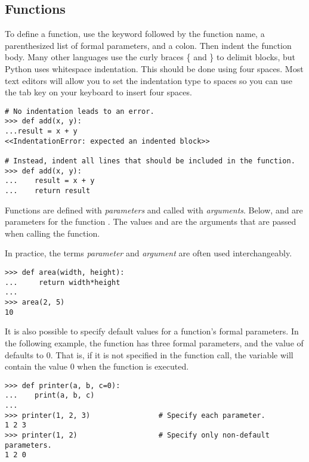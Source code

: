 \subsection*{Functions}

To define a function, use the  keyword followed by the function name, a parenthesized list of formal parameters, and a colon.
Then indent the function body.
Many other languages use the curly braces \{ and \} to delimit blocks, but Python uses whitespace indentation.
This should be done using four spaces.
Most text editors will allow you to set the indentation type to spaces so you can use the tab key on your keyboard to insert four spaces.

\begin{lstlisting}
# No indentation leads to an error.
>>> def add(x, y):
...result = x + y
<<IndentationError: expected an indented block>>

# Instead, indent all lines that should be included in the function.
>>> def add(x, y):
...    result = x + y
...    return result
\end{lstlisting}

Functions are defined with \emph{parameters} and called with \emph{arguments}.
Below,  and  are parameters for the function .
The values  and  are the arguments that are passed when calling the function.

In practice, the terms \emph{parameter} and \emph{argument} are often used interchangeably.

\begin{lstlisting}
>>> def area(width, height):
...     return width*height
...         
>>> area(2, 5)
10
\end{lstlisting}

It is also possible to specify default values for a function's formal parameters.
In the following example, the function  has three formal parameters, and the value of  defaults to 0.
That is, if it is not specified in the function call, the variable  will contain the value 0 when the function is executed.

\begin{lstlisting}
>>> def printer(a, b, c=0):
...    print(a, b, c)
...
>>> printer(1, 2, 3)                # Specify each parameter.
1 2 3
>>> printer(1, 2)                   # Specify only non-default parameters.
1 2 0
\end{lstlisting} %


